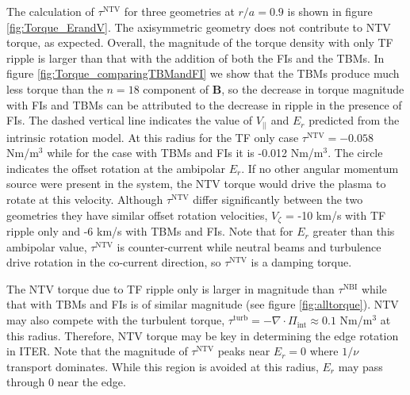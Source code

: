 \documentclass[aip, pop, preprint]{revtex4-1}
\numberwithin{figure}{section}
\numberwithin{equation}{section}
\begin{document}
The calculation of $\tau^{\text{NTV}}$ for three geometries at $r/a = 0.9$ is shown in figure \ref{fig:Torque_ErandV}. The axisymmetric geometry does not contribute to NTV torque, as expected. Overall, the magnitude of the torque density with only TF ripple is larger than that with the addition of both the FIs and the TBMs.  In figure \ref{fig:Torque_comparingTBMandFI} we show that the TBMs produce much less torque than the $n = 18$ component of $\bm{B}$, so the decrease in torque magnitude with FIs and TBMs can be attributed to the decrease in ripple in the presence of FIs. The dashed vertical line indicates the value of $V_{||}$ and $E_r$ predicted from the intrinsic rotation model. At this radius for the TF only case $\tau^{\text{NTV}} = -0.058$ Nm/m$^3$ while for the case with TBMs and FIs it is -0.012 Nm/m$^3$. The circle indicates the offset rotation at the ambipolar $E_r$. If no other angular momentum source were present in the system, the NTV torque would drive the plasma to rotate at this velocity. Although $\tau^{\text{NTV}}$ differ significantly between the two geometries they have similar offset rotation velocities, $V_{\zeta}$ = -10 km/s with TF ripple only and -6 km/s with TBMs and FIs. Note that for $E_r$ greater than this ambipolar value, $\tau^{\text{NTV}}$ is counter-current while neutral beams and turbulence drive rotation in the co-current direction, so $\tau^{\text{NTV}}$ is a damping torque. 

The NTV torque due to TF ripple only is larger in magnitude than $\tau^{\text{NBI}}$ while that with TBMs and FIs is of similar magnitude (see figure \ref{fig:alltorque}). NTV may also compete with the turbulent torque, $\tau^{\text{turb}} = - \nabla \cdot \Pi_{\text{int}} \approx 0.1$ Nm/m$^3$ at this radius. Therefore, NTV torque may be key in determining the edge rotation in ITER. Note that the magnitude of $\tau^{\text{NTV}}$ peaks near $E_r = 0$ where $1/\nu$ transport dominates. While this region is avoided at this radius, $E_r$ may pass through 0 near the edge. 

\FloatBarrier
\end{document}
